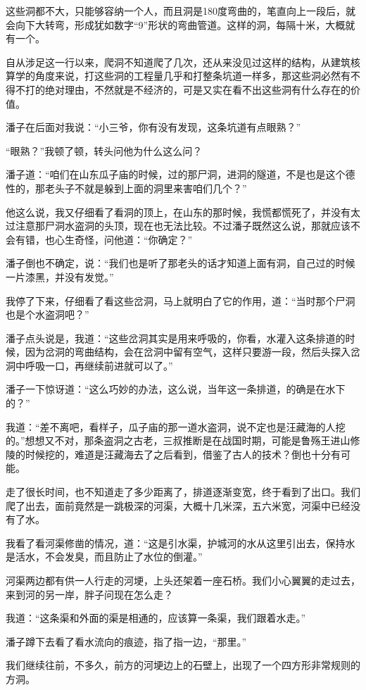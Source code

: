 这些洞都不大，只能够容纳一个人，而且洞是180度弯曲的，笔直向上一段后，就会向下大转弯，形成犹如数字“9”形状的弯曲管道。这样的洞，每隔十米，大概就有一个。

自从涉足这一行以来，爬洞不知道爬了几次，还从来没见过这样的结构，从建筑核算学的角度来说，打这些洞的工程量几乎和打整条坑道一样多，那这些洞必然有不得不打的绝对理由，不然就是不经济的，可是又实在看不出这些洞有什么存在的价值。

潘子在后面对我说：“小三爷，你有没有发现，这条坑道有点眼熟？”

“眼熟？”我顿了顿，转头问他为什么这么问？

潘子道：“咱们在山东瓜子庙的时候，过的那尸洞，进洞的隧道，不是也是这个德性的，那老头子不就是躲到上面的洞里来害咱们几个？”

他这么说，我又仔细看了看洞的顶上，在山东的那时候，我慌都慌死了，并没有太过注意那尸洞水盗洞的头顶，现在也无法比较。不过潘子既然这么说，那就应该不会有错，也心生奇怪，问他道：“你确定？”

潘子倒也不确定，说：“我们也是听了那老头的话才知道上面有洞，自己过的时候一片漆黑，并没有发觉。”

我停了下来，仔细看了看这些岔洞，马上就明白了它的作用，道：“当时那个尸洞也是个水盗洞吧？”

潘子点头说是，我道：“这些岔洞其实是用来呼吸的，你看，水灌入这条排道的时候，因为岔洞的弯曲结构，会在岔洞中留有空气，这样只要游一段，然后头探入岔洞中呼吸一口，再继续前进就可以了。”

潘子一下惊讶道：“这么巧妙的办法，这么说，当年这一条排道，的确是在水下的？”

我道：“差不离吧，看样子，瓜子庙的那一道水盗洞，说不定也是汪藏海的人挖的。”想想又不对，那条盗洞之古老，三叔推断是在战国时期，可能是鲁殇王进山修陵的时候挖的，难道是汪藏海去了之后看到，借鉴了古人的技术？倒也十分有可能。

走了很长时间，也不知道走了多少距离了，排道逐渐变宽，终于看到了出口。我们爬了出去，面前竟然是一跳极深的河渠，大概十几米深，五六米宽，河渠中已经没有了水。

我看了看河渠修凿的情况，道：“这是引水渠，护城河的水从这里引出去，保持水是活水，不会发臭，而且防止了水位的倒灌。”

河渠两边都有供一人行走的河埂，上头还架着一座石桥。我们小心翼翼的走过去，来到河的另一岸，胖子问现在怎么走？

我道：“这条渠和外面的渠是相通的，应该算一条渠，我们跟着水走。”

潘子蹲下去看了看水流向的痕迹，指了指一边，“那里。”

我们继续往前，不多久，前方的河埂边上的石壁上，出现了一个四方形非常规则的方洞。

